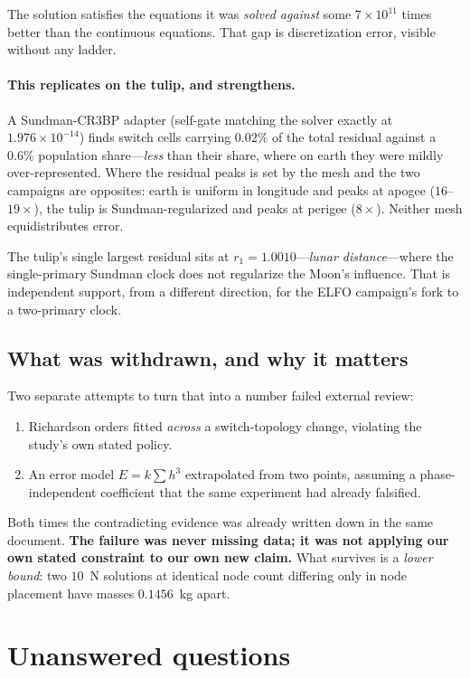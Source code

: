 \documentclass[11pt]{article}
\begin{document}
The solution satisfies the equations it was \emph{solved against} some
$7\times10^{11}$ times better than the continuous equations. That gap is
discretization error, visible without any ladder.

\paragraph{This replicates on the tulip, and strengthens.} A Sundman-CR3BP
adapter (self-gate matching the solver exactly at $1.976\times10^{-14}$) finds
switch cells carrying $0.02\%$ of the total residual against a $0.6\%$
population share---\emph{less} than their share, where on earth they were
mildly over-represented. Where the residual peaks is set by the mesh and the
two campaigns are opposites: earth is uniform in longitude and peaks at apogee
($16$--$19\times$), the tulip is Sundman-regularized and peaks at perigee
($8\times$). Neither mesh equidistributes error.

The tulip's single largest residual sits at $r_1 = 1.0010$---\emph{lunar
distance}---where the single-primary Sundman clock does not regularize the
Moon's influence. That is independent support, from a different direction, for
the ELFO campaign's fork to a two-primary clock.

\subsection{What was withdrawn, and why it matters}

Two separate attempts to turn that into a number failed external review:

\begin{enumerate}
  \item Richardson orders fitted \emph{across} a switch-topology change,
  violating the study's own stated policy.
  \item An error model $E = k\sum h^3$ extrapolated from two points, assuming a
  phase-independent coefficient that the same experiment had already falsified.
\end{enumerate}

Both times the contradicting evidence was already written down in the same
document. \textbf{The failure was never missing data; it was not applying our
own stated constraint to our own new claim.} What survives is a
\emph{lower bound}: two $10$~N solutions at identical node count differing only
in node placement have masses $0.1456$~kg apart.

\section{Unanswered questions}
\end{document}
